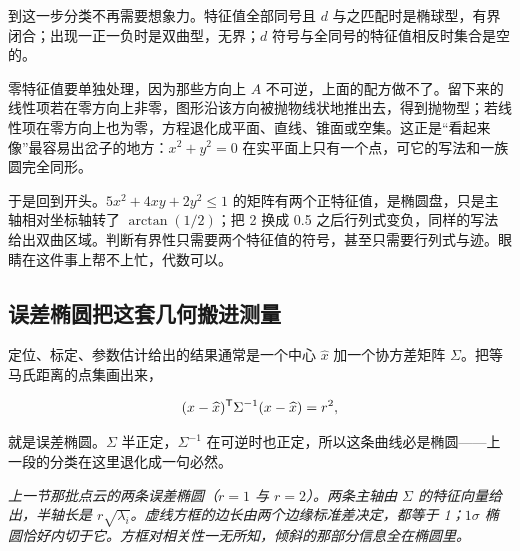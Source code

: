 到这一步分类不再需要想象力。特征值全部同号且 \(d\) 与之匹配时是椭球型，有界闭合；出现一正一负时是双曲型，无界；\(d\) 符号与全同号的特征值相反时集合是空的。

零特征值要单独处理，因为那些方向上 \(A\) 不可逆，上面的配方做不了。留下来的线性项若在零方向上非零，图形沿该方向被抛物线状地推出去，得到抛物型；若线性项在零方向上也为零，方程退化成平面、直线、锥面或空集。这正是``看起来像''最容易出岔子的地方：\(x^2+y^2=0\) 在实平面上只有一个点，可它的写法和一族圆完全同形。

于是回到开头。\(5x^2+4xy+2y^2\le1\) 的矩阵有两个正特征值，是椭圆盘，只是主轴相对坐标轴转了 \(\arctan(1/2)\)；把 2 换成 0.5 之后行列式变负，同样的写法给出双曲区域。判断有界性只需要两个特征值的符号，甚至只需要行列式与迹。眼睛在这件事上帮不上忙，代数可以。

\subsection{误差椭圆把这套几何搬进测量}

定位、标定、参数估计给出的结果通常是一个中心 \(\widehat x\) 加一个协方差矩阵 \(\Sigma\)。把等马氏距离的点集画出来，

\[
(x-\widehat x)^{\mathsf{T}}\Sigma^{-1}(x-\widehat x)=r^2,
\]

就是误差椭圆。\(\Sigma\) 半正定，\(\Sigma^{-1}\) 在可逆时也正定，所以这条曲线必是椭圆——上一段的分类在这里退化成一句必然。

\begin{center}

\emph{上一节那批点云的两条误差椭圆（\(r=1\) 与 \(r=2\)）。两条主轴由 \(\Sigma\) 的特征向量给出，半轴长是 \(r\sqrt{\lambda_i}\)。虚线方框的边长由两个边缘标准差决定，都等于 1；\(1\sigma\) 椭圆恰好内切于它。方框对相关性一无所知，倾斜的那部分信息全在椭圆里。}
\end{center}

